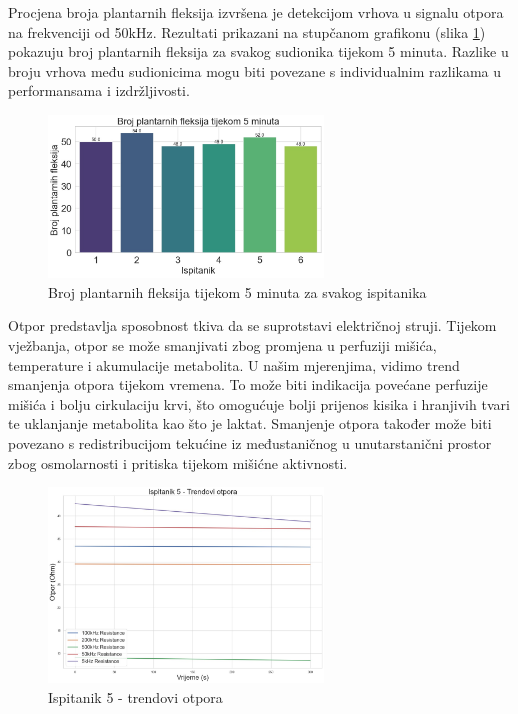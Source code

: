 \documentclass[../diplomski_rad.tex]{subfiles}
\begin{document}
Procjena broja plantarnih fleksija izvršena je detekcijom vrhova u signalu otpora na frekvenciji od 50kHz. 
Rezultati prikazani na stupčanom grafikonu (slika \ref{slk:broj_fleksija}) pokazuju broj plantarnih 
fleksija za svakog sudionika tijekom 5 minuta. 
Razlike u broju vrhova među sudionicima mogu biti povezane s individualnim razlikama u performansama i izdržljivosti.

\begin{figure}[htb]
    \centering
    \includegraphics[width=0.65\textwidth]{Figures/broj_fleksija.jpeg} 
    \caption{Broj plantarnih fleksija tijekom 5 minuta za svakog ispitanika}
    \label{slk:broj_fleksija}
\end{figure}

Otpor predstavlja sposobnost tkiva da se suprotstavi električnoj struji. 
Tijekom vježbanja, otpor se može smanjivati zbog promjena u perfuziji mišića, 
temperature i akumulacije metabolita. U našim mjerenjima, vidimo trend smanjenja otpora tijekom vremena. 
To može biti indikacija povećane perfuzije mišića i bolju cirkulaciju krvi, 
što omogućuje bolji prijenos kisika i hranjivih tvari te uklanjanje metabolita kao što je laktat. 
Smanjenje otpora također može biti povezano s redistribucijom tekućine iz 
međustaničnog u unutarstanični prostor zbog osmolarnosti i pritiska tijekom mišićne aktivnosti.

\begin{figure}[htb]
    \centering
    \includegraphics[width=0.65\textwidth]{Figures/trend.jpeg} 
    \caption{Ispitanik 5 - trendovi otpora}
    \label{slk:trend}
\end{figure}
\end{document}
